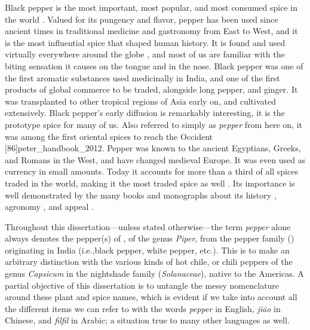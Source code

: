 Black pepper is the most important, most popular, and most consumed spice in the world \autocite[721]{mabberley_mabberleys_2017}. Valued for its pungency and flavor, pepper has been used since ancient times in traditional medicine and gastronomy from East to West, and it is the most influential spice that shaped human history. It is found and used virtually everywhere around the globe \autocite[253]{hill_contemporary_2004}, and most of us are familiar with the biting sensation it causes on the tongue and in the nose. Black pepper was one of the first aromatic substances used medicinally in India, and one of the first products of global commerce to be traded, alongside long pepper, and ginger. It was transplanted to other tropical regions of Asia early on, and cultivated extensively. Black pepper's early diffusion is remarkably interesting, it is the prototype spice for many of us. Also referred to simply as \textit{pepper} from here on, it was among the first oriental spices to reach the Occident [86]{peter_handbook_2012}. Pepper was known to the ancient Egyptians, Greeks, and Romans in the West, and have changed medieval Europe. It was even used as currency in small amounts. Today it accounts for more than a third of all spices traded in the world, making it the most traded spice as well \autocite{ravindran_piper_2017}. Its importance is well demonstrated by the many books and monographs about its history \autocite[see][]{shaffer_pepper_2013,wernick_pepper_2014}, agronomy \autocite[see][]{ravindran_black_2000,nair_geography_2020}, and appeal \autocite[see][]{de_kerros_pepper_2016,barth_pepper_2019}.

\begin{note}
    Throughout this dissertation---unless stated otherwise---the term \textit{pepper} alone always denotes the pepper(s) of , of the genus \textit{Piper}, from the pepper family () originating in India (i.e.,black pepper, white pepper, etc.). This is to make an arbitrary distinction with the various kinds of hot chile, or chili peppers of the genus \textit{Capsicum} in the nightshade family (\textit{Solanaceae}), native to the Americas. A partial objective of this dissertation is to untangle the messy nomenclature around these plant and spice names, which is evident if we take into account all the different items we can refer to with the words \textit{pepper} in English, \textit{jiāo} in Chinese, and \textit{filfil} in Arabic; a situation true to many other languages as well. 
    \end{note}


